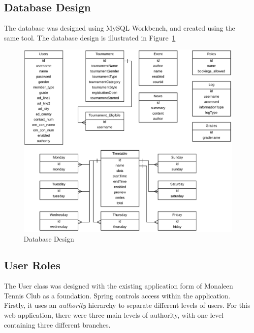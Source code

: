 \subsection{Database Design}

The database was designed using MySQL Workbench, and created using the same tool. The database design is illustrated in Figure~\ref{fig:dbdesign}

\begin{figure}[H]
\begin{center}
\includegraphics[width=14cm]{dbdesign.png}
\end{center}
\caption{Database Design}
\label{fig:dbdesign}
\end{figure}



\subsection{User Roles}

The User class was designed with the existing application form of Monaleen Tennis Club as a foundation. 
Spring controls access within the application. Firstly, it uses an \textit{authority} hierarchy to separate different levels of users. For this web application, there were three main levels of authority, with one level containing three different branches.

